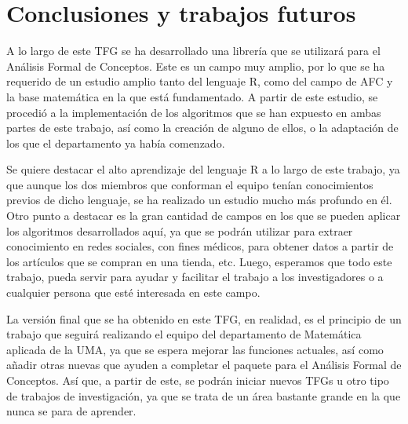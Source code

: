 \section{Conclusiones y trabajos futuros}

A lo largo de este TFG se ha desarrollado una librer\'ia que se utilizar\'a para el An\'alisis Formal de Conceptos. Este es un 
campo muy amplio, por lo que se ha requerido de un estudio amplio tanto del lenguaje R, como del campo de AFC y la base matem\'atica en la que 
est\'a fundamentado. A partir de este estudio, se procedi\'o a la implementaci\'on de los algoritmos que se han expuesto en ambas partes de 
este trabajo, as\'i como la creaci\'on de alguno de ellos, o la adaptaci\'on de los que el departamento ya hab\'ia comenzado.

Se quiere destacar el alto aprendizaje del lenguaje R a lo largo de este trabajo, ya que aunque los dos miembros que conforman el equipo ten\'ian 
conocimientos previos de dicho lenguaje, se ha realizado un estudio mucho m\'as profundo en \'el.
Otro punto a destacar es la gran cantidad de campos en los que se pueden aplicar los algoritmos desarrollados aqu\'i, ya que se podr\'an 
utilizar para extraer conocimiento en redes sociales, con fines m\'edicos, para obtener datos a partir de los art\'iculos que se compran 
en una tienda, etc. Luego, esperamos que todo este trabajo, pueda servir para ayudar y facilitar el trabajo a los investigadores o a cualquier persona 
que est\'e interesada en este campo.

La versi\'on final que se ha obtenido en este TFG, en realidad, es el principio de un trabajo que seguir\'a realizando el equipo del 
departamento de Matem\'atica aplicada de la UMA, ya que se espera mejorar las funciones actuales, as\'i como a\~nadir otras nuevas 
que ayuden a completar el paquete para el An\'alisis Formal de Conceptos. As\'i que, a partir de este, se podr\'an iniciar nuevos TFGs u otro 
tipo de trabajos de investigaci\'on, ya que se trata de un \'area bastante grande en la que nunca se para de aprender.

\newpage
\thispagestyle{empty}
\mbox{}
\newpage